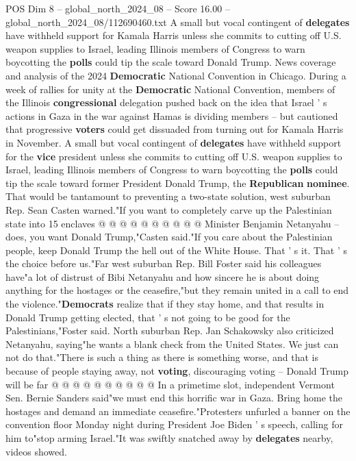 \begin{textsample}{POS Dim 8 – global\_north\_2024\_08 – Score 16.00 – global\_north\_2024\_08/112690460.txt}  \label{ex:f8_pos_032}
A small but vocal contingent of \textbf{delegates} have withheld support for Kamala Harris unless she commits to cutting off U.S. weapon supplies to Israel, leading Illinois members of Congress to warn boycotting the \textbf{polls} could tip the scale toward Donald Trump.
News coverage and analysis of the 2024 \textbf{Democratic} National Convention in Chicago.
During a week of rallies for unity at the \textbf{Democratic} National Convention, members of the Illinois \textbf{congressional} delegation pushed back on the idea that Israel ' s actions in Gaza in the war against Hamas is dividing members -- but cautioned that progressive \textbf{voters} could get dissuaded from turning out for Kamala Harris in November.
A small but vocal contingent of \textbf{delegates} have withheld support for the \textbf{vice} president unless she commits to cutting off U.S. weapon supplies to Israel, leading Illinois members of Congress to warn boycotting the \textbf{polls} could tip the scale toward former President Donald Trump, the \textbf{Republican} \textbf{nominee}.
That would be tantamount to preventing a two-state solution, west suburban Rep.
Sean Casten warned."If you want to completely carve up the Palestinian state into 15 enclaves @ @ @ @ @ @ @ @ @ @ Minister Benjamin Netanyahu -- does, you want Donald Trump,"Casten said."If you care about the Palestinian people, keep Donald Trump the hell out of the White House.
That ' s it.
That ' s the choice before us."Far west suburban Rep.
Bill Foster said his colleagues have"a lot of distrust of Bibi Netanyahu and how sincere he is about doing anything for the hostages or the ceasefire,"but they remain united in a call to end the violence."\textbf{Democrats} realize that if they stay home, and that results in Donald Trump getting elected, that ' s not going to be good for the Palestinians,"Foster said.
North suburban Rep.
Jan Schakowsky also criticized Netanyahu, saying"he wants a blank check from the United States.
We just can not do that."There is such a thing as there is something worse, and that is because of people staying away, not \textbf{voting}, discouraging voting -- Donald Trump will be far @ @ @ @ @ @ @ @ @ @ In a primetime slot, independent Vermont Sen.
Bernie Sanders said"we must end this horrific war in Gaza.
Bring home the hostages and demand an immediate ceasefire."Protesters unfurled a banner on the convention floor Monday night during President Joe Biden ' s speech, calling for him to"stop arming Israel."It was swiftly snatched away by \textbf{delegates} nearby, videos showed.

\end{textsample}
